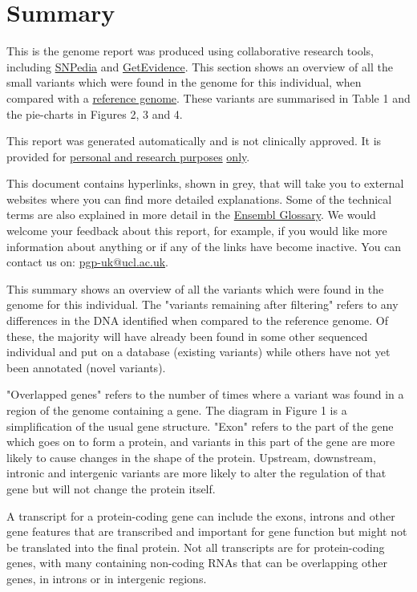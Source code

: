 \documentclass{article}
\begin{document}


\section{Summary}

This is the genome report was produced using collaborative research tools, including \href{https://www.snpedia.com}{SNPedia} and \href{http://evidence.pgp-hms.org/about}{GetEvidence}. This section shows an overview of all the small variants which were found in the genome for this individual, when compared with a \href{http://www.ncbi.nlm.nih.gov/projects/genome/assembly/grc/human/}{reference genome}. These variants are summarised in Table 1 and the pie-charts in Figures 2, 3 and 4.
\par
This report was generated automatically and is not clinically approved. It is provided for \underline{personal and research purposes} \underline{only}. 
\par
This document contains hyperlinks, shown in \textcolor{earlgrey}{grey}, that will take you to external websites where you can find more detailed explanations. Some of the technical terms are also explained in more detail in the \href{http://www.ensembl.org/Help/Glossary}{Ensembl Glossary}. We would welcome your feedback about this report, for example, if you would like more information about anything or if any of the links have become inactive. You can contact us on: \href{mailto:pgp-uk@ucl.ac.uk}{pgp-uk@ucl.ac.uk}.
\par
\par
This summary shows an overview of all the variants which were found in the genome for this individual. The "variants remaining after filtering" refers to any differences in the DNA identified when compared to the reference genome. Of these, the majority will have already been found in some other sequenced individual and put on a database (existing variants) while others have not yet been annotated (novel variants). 
\par
 "Overlapped genes" refers to the number of times where a variant was found in a region of the genome containing a gene. The diagram in Figure 1 is a simplification of the usual gene structure.
 "Exon" refers to the part of the gene which goes on to form a protein, and variants in this part of the gene are more likely to cause changes in the shape of the protein. Upstream, downstream, intronic and intergenic variants are more likely to alter the regulation of that gene but will not change the protein itself.
\par
A transcript for a protein-coding gene can include the exons, introns and other gene features that are transcribed and important for gene function but might not be translated into the final protein. Not all transcripts are for protein-coding genes, with many containing non-coding RNAs that can be overlapping other genes, in introns or in intergenic regions.
\vspace{5 mm}
\end{document}
